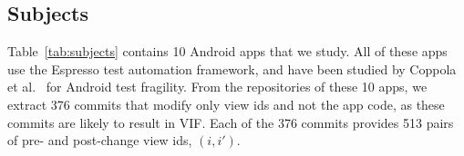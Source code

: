 \documentclass[sigconf]{acmart}
\begin{document}
\begin{table}[ht]
  \caption{List of subject Android apps\label{tab:subjects}}
\end{table}

\subsection{Subjects}
\label{sec:subjects}

Table~\ref{tab:subjects} contains 10 Android apps that we study. All of these
apps use the Espresso test automation framework, and have been studied by
Coppola et al.~\cite{Coppola2019fv} for Android test fragility. From the
repositories of these 10 apps, we extract 376 commits that modify only
view ids and not the app code, as these commits are likely to result in VIF.
Each of the 376 commits provides 513 pairs of pre- and post-change view
ids, $(i, i')$. 
\end{document}
